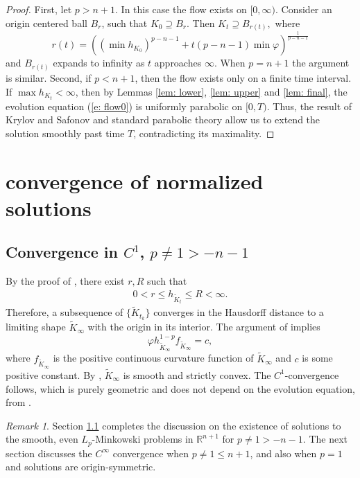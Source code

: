\documentclass{amsart}
\theoremstyle{definition}
\theoremstyle{remark}
\newtheorem{remark}[theorem]{Remark}
\numberwithin{equation}{section}
\begin{document}
\begin{proof}
First, let $p> n+1.$ In this case the flow exists on $[0,\infty).$
Consider an origin centered ball $B_r$, such that $K_0\supseteq B_r.$ Then $K_t\supseteq B_{r(t)},$ where $$r(t)=\left((\min h_{K_0})^{p-n-1}+t(p-n-1)\min \varphi \right)^{\frac{1}{p-n-1}}$$ and $B_{r(t)}$ expands to infinity as $t$ approaches $\infty$. When $p=n+1$ the argument is similar. Second, if $p<n+1$, then the flow exists only on a finite time interval. If $\max h_{K_t}<\infty$, then by Lemmas \ref{lem: lower}, \ref{lem: upper} and \ref{lem: final}, the evolution equation (\ref{e: flow0}) is uniformly parabolic on $[0,T)$. Thus, the result of Krylov and Safonov \cite{Krylov-Safonov} and standard parabolic theory allow us to extend the solution smoothly past time $T$, contradicting its maximality.
\end{proof}
\section{convergence of normalized solutions}\label{sec: nor conv}
\subsection{Convergence in $C^{1}$, $p\neq 1>-n-1$}\label{sec}
By the proof of \cite[Corollary 7.5]{Ivaki 2014-gauss}, there exist $r,R$ such that
\begin{align}\label{ratio}
0<r\leq h_{\tilde{K}_t}\leq R<\infty.
\end{align}
Therefore, a subsequence of $\{\tilde{K}_{t_k}\}$ converges in the Hausdorff distance to a limiting shape $\tilde{K}_{\infty}$ with the origin in its interior. The argument of \cite[Section 8.1]{Ivaki 2014-gauss} implies  $$\varphi h_{\tilde{K}_{\infty}}^{1-p}f_{\tilde{K}_{\infty}}=c,$$ where $f_{\tilde{K}_{\infty}}$ is the positive continuous curvature function of $\tilde{K}_{\infty}$ and $c$ is some positive constant. By \cite[Fact 8.1]{Ivaki 2014-gauss}, $\tilde{K}_{\infty}$  is smooth and strictly convex. The $C^1$-convergence follows, which is purely geometric and does not depend on the evolution equation, from \cite[Lemma 13]{Andrews 1997}.
\begin{remark}\label{rem}
Section \ref{sec} completes the discussion on the existence of solutions to the smooth, even $L_p$-Minkowski problems in $\mathbb{R}^{n+1}$ for $p\neq 1>-n-1.$ The next section discusses  the $C^{\infty}$ convergence when $p\neq1\leq n+1$, and also when $p=1$ and solutions are origin-symmetric.
\end{remark}
\end{document}
